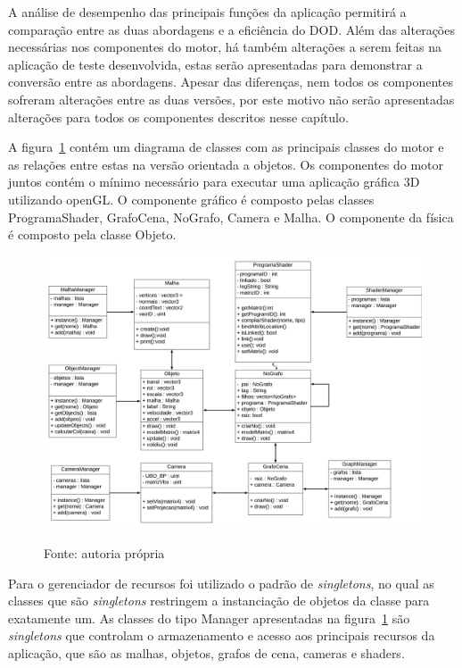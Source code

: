 A análise de desempenho das principais funções da aplicação 
permitirá a comparação entre as duas abordagens e a eficiência do
DOD. Além das alterações necessárias nos componentes do motor, há 
também alterações a serem feitas na aplicação de teste 
desenvolvida, estas serão apresentadas para demonstrar a conversão 
entre as abordagens. Apesar das diferenças, nem todos os componentes 
sofreram alterações entre as duas versões, por este motivo não 
serão apresentadas alterações para todos os componentes descritos 
nesse capítulo.

A figura~\ref{umlengine} contém um diagrama de classes com as principais
classes do motor e as relações entre estas na versão orientada a objetos. Os 
componentes do motor juntos contém o mínimo necessário para executar uma 
aplicação gráfica 3D utilizando openGL. O componente gráfico é composto pelas 
classes ProgramaShader, GrafoCena, NoGrafo, Camera e Malha. O componente da 
física é composto pela classe Objeto. 

\begin{figure}[h!]
    \centering
    \includegraphics[width =.8\textwidth]{../figuras/uml_engine}
    \par\medskip
    Fonte: autoria própria
    \label{umlengine}
\end{figure}

Para o gerenciador de recursos foi 
utilizado o padrão de \textit{singletons}, no qual as 
classes que são \textit{singletons} restringem a instanciação de objetos da 
classe para exatamente um. As classes do tipo Manager apresentadas na 
figura~\ref{umlengine} são \textit{singletons} que controlam o armazenamento e 
acesso aos principais recursos da aplicação, que são as malhas, objetos, grafos 
de cena, cameras e shaders.

